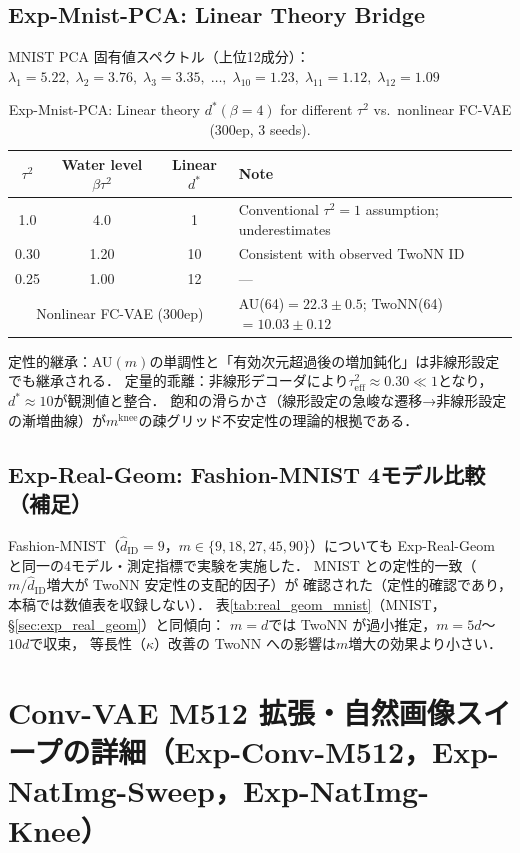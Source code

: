 \documentclass[11pt,a4paper]{jsarticle}
\newcommand{\kap}{\kappa}
\newcommand{\mknee}{m^{\mathrm{knee}}}
\begin{document}
\subsection*{Exp-Mnist-PCA: Linear Theory Bridge}

MNIST PCA 固有値スペクトル（上位12成分）：
$\lambda_1=5.22,\; \lambda_2=3.76,\; \lambda_3=3.35,\;\ldots,\;\lambda_{10}=1.23,\; \lambda_{11}=1.12,\; \lambda_{12}=1.09$

\begin{table}[H]
\centering
\caption{Exp-Mnist-PCA: Linear theory $d^*(\beta=4)$ for different $\tau^2$ vs.\ nonlinear FC-VAE (300ep, 3 seeds).}
\label{tab:theory_pred}
\small
\begin{tabular}{ccc|l}
\toprule
$\tau^2$ & Water level $\beta\tau^2$ & Linear $d^*$ & Note \\
\midrule
1.0  & 4.0  & 1   & Conventional $\tau^2=1$ assumption; underestimates \\
0.30 & 1.20 & 10  & Consistent with observed TwoNN ID \\
0.25 & 1.00 & 12  & --- \\
\midrule
\multicolumn{3}{c|}{Nonlinear FC-VAE (300ep)} & AU(64)$=22.3\pm0.5$; TwoNN(64)$=10.03\pm0.12$ \\
\bottomrule
\end{tabular}
\end{table}

定性的継承：AU$(m)$の単調性と「有効次元超過後の増加鈍化」は非線形設定でも継承される．
定量的乖離：非線形デコーダにより$\tau^2_\mathrm{eff} \approx 0.30 \ll 1$となり，$d^* \approx 10$が観測値と整合．
飽和の滑らかさ（線形設定の急峻な遷移→非線形設定の漸増曲線）が$\mknee$の疎グリッド不安定性の理論的根拠である．

\subsection*{Exp-Real-Geom: Fashion-MNIST 4モデル比較（補足）}

Fashion-MNIST（$\hat{d}_\mathrm{ID}=9$，$m \in \{9,18,27,45,90\}$）についても
Exp-Real-Geom と同一の4モデル・測定指標で実験を実施した．
MNIST との定性的一致（$m/\hat{d}_\mathrm{ID}$増大が TwoNN 安定性の支配的因子）が
確認された（定性的確認であり，本稿では数値表を収録しない）．
表\ref{tab:real_geom_mnist}（MNIST，§\ref{sec:exp_real_geom}）と同傾向：
$m = d$では TwoNN が過小推定，$m = 5d$〜$10d$で収束，
等長性（$\kap$）改善の TwoNN への影響は$m$増大の効果より小さい．

\section{Conv-VAE M512 拡張・自然画像スイープの詳細（Exp-Conv-M512，Exp-NatImg-Sweep，Exp-NatImg-Knee）}\label{app:convvae_natimg}
\end{document}
